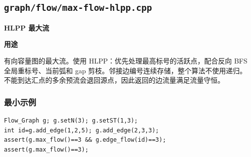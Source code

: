 \documentclass[UTF8,a4paper,10pt]{ctexart}
\newcommand{\TemplUsage}[1]{\textbf{用途}\par #1\par}
\begin{document}
\subsection{\texttt{graph/flow/max-flow-hlpp.cpp}}
\textbf{HLPP 最大流}\par
\TemplUsage{有向容量图的最大流。使用 HLPP：优先处理最高标号的活跃点，配合反向 BFS 全局重标号、当前弧和 gap 剪枝。邻接边编号连续存储，整个算法不使用递归。不能到达汇点的多余预流会退回源点，因此返回的边流量满足流量守恒。}
\subsubsection*{最小示例}
\begin{lstlisting}
Flow_Graph g; g.setN(3); g.setST(1,3);
int id=g.add_edge(1,2,5); g.add_edge(2,3,3);
assert(g.max_flow()==3 && g.edge_flow(id)==3);
assert(g.max_flow()==3);
\end{lstlisting}
\end{document}
